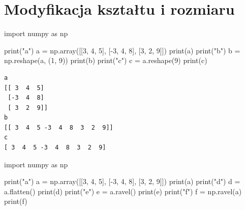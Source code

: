\documentclass[
  letterpaper,
  DIV=11,
  numbers=noendperiod]{scrreprt}
\newenvironment{Shaded}{\begin{snugshade}}{\end{snugshade}}
\newcommand{\BuiltInTok}[1]{\textcolor[rgb]{0.00,0.23,0.31}{#1}}
\newcommand{\DecValTok}[1]{\textcolor[rgb]{0.68,0.00,0.00}{#1}}
\newcommand{\ImportTok}[1]{\textcolor[rgb]{0.00,0.46,0.62}{#1}}
\newcommand{\NormalTok}[1]{\textcolor[rgb]{0.00,0.23,0.31}{#1}}
\newcommand{\OperatorTok}[1]{\textcolor[rgb]{0.37,0.37,0.37}{#1}}
\newcommand{\StringTok}[1]{\textcolor[rgb]{0.13,0.47,0.30}{#1}}
\begin{document}
\chapter{Modyfikacja kształtu i
rozmiaru}\label{modyfikacja-ksztaux142tu-i-rozmiaru}

\begin{Shaded}
\begin{Highlighting}[]
\ImportTok{import}\NormalTok{ numpy }\ImportTok{as}\NormalTok{ np}

\BuiltInTok{print}\NormalTok{(}\StringTok{"a"}\NormalTok{)}
\NormalTok{a }\OperatorTok{=}\NormalTok{ np.array([[}\DecValTok{3}\NormalTok{, }\DecValTok{4}\NormalTok{, }\DecValTok{5}\NormalTok{], [}\OperatorTok{{-}}\DecValTok{3}\NormalTok{, }\DecValTok{4}\NormalTok{, }\DecValTok{8}\NormalTok{], [}\DecValTok{3}\NormalTok{, }\DecValTok{2}\NormalTok{, }\DecValTok{9}\NormalTok{]])}
\BuiltInTok{print}\NormalTok{(a)}
\BuiltInTok{print}\NormalTok{(}\StringTok{"b"}\NormalTok{)}
\NormalTok{b }\OperatorTok{=}\NormalTok{ np.reshape(a, (}\DecValTok{1}\NormalTok{, }\DecValTok{9}\NormalTok{))}
\BuiltInTok{print}\NormalTok{(b)}
\BuiltInTok{print}\NormalTok{(}\StringTok{"c"}\NormalTok{)}
\NormalTok{c }\OperatorTok{=}\NormalTok{ a.reshape(}\DecValTok{9}\NormalTok{)}
\BuiltInTok{print}\NormalTok{(c)}
\end{Highlighting}
\end{Shaded}

\begin{verbatim}
a
[[ 3  4  5]
 [-3  4  8]
 [ 3  2  9]]
b
[[ 3  4  5 -3  4  8  3  2  9]]
c
[ 3  4  5 -3  4  8  3  2  9]
\end{verbatim}

\begin{Shaded}
\begin{Highlighting}[]
\ImportTok{import}\NormalTok{ numpy }\ImportTok{as}\NormalTok{ np}

\BuiltInTok{print}\NormalTok{(}\StringTok{"a"}\NormalTok{)}
\NormalTok{a }\OperatorTok{=}\NormalTok{ np.array([[}\DecValTok{3}\NormalTok{, }\DecValTok{4}\NormalTok{, }\DecValTok{5}\NormalTok{], [}\OperatorTok{{-}}\DecValTok{3}\NormalTok{, }\DecValTok{4}\NormalTok{, }\DecValTok{8}\NormalTok{], [}\DecValTok{3}\NormalTok{, }\DecValTok{2}\NormalTok{, }\DecValTok{9}\NormalTok{]])}
\BuiltInTok{print}\NormalTok{(a)}
\BuiltInTok{print}\NormalTok{(}\StringTok{"d"}\NormalTok{)}
\NormalTok{d }\OperatorTok{=}\NormalTok{ a.flatten()}
\BuiltInTok{print}\NormalTok{(d)}
\BuiltInTok{print}\NormalTok{(}\StringTok{"e"}\NormalTok{)}
\NormalTok{e }\OperatorTok{=}\NormalTok{ a.ravel()}
\BuiltInTok{print}\NormalTok{(e)}
\BuiltInTok{print}\NormalTok{(}\StringTok{"f"}\NormalTok{)}
\NormalTok{f }\OperatorTok{=}\NormalTok{ np.ravel(a)}
\BuiltInTok{print}\NormalTok{(f)}
\end{Highlighting}
\end{Shaded}
\end{document}
